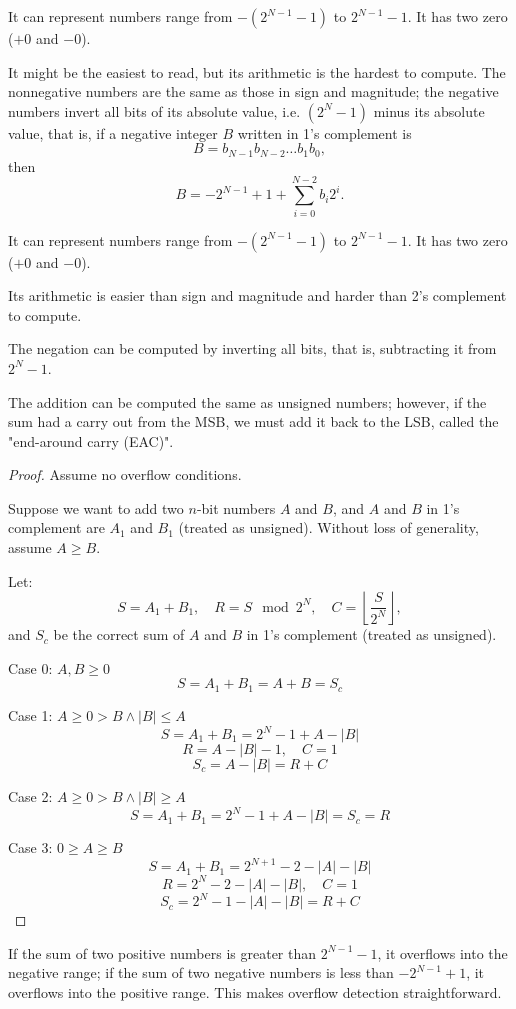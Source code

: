 \documentclass[a4paper,12pt]{report}
\begin{document}
It can represent numbers range from $-(2^{N-1}-1)$ to $2^{N-1}-1$. It has two zero ($+0$ and $-0$).

It might be the easiest to read, but its arithmetic is the hardest to compute.
The nonnegative numbers are the same as those in sign and magnitude; the negative numbers invert all bits of its absolute value, i.e. $(2^N-1)$ minus its absolute value, that is, if a negative integer $B$ written in 1's complement is
\[B=b_{N-1}b_{N-2}\ldots b_1b_0,\]
then
\[B=-2^{N-1}+1+\sum_{i=0}^{N-2}b_i2^i.\]

It can represent numbers range from $-(2^{N-1}-1)$ to $2^{N-1}-1$. It has two zero ($+0$ and $-0$). 

Its arithmetic is easier than sign and magnitude and harder than 2's complement to compute. 

The negation can be computed by inverting all bits, that is, subtracting it from $2^N-1$.

The addition can be computed the same as unsigned numbers; however, if the sum had a carry out from the MSB, we must add it back to the LSB, called the "end-around carry (EAC)".
\begin{proof}
Assume no overflow conditions.

Suppose we want to add two $n$-bit numbers $A$ and $B$, and $A$ and $B$ in 1's complement are $A_1$ and $B_1$ (treated as unsigned). Without loss of generality, assume $A\geq B$.

Let:
\[S = A_1 + B_1,\quad R=S \mod 2^N, \quad C=\left\lfloor\frac{S}{2^N}\right\rfloor,\]
and $S_c$ be the correct sum of $A$ and $B$ in 1's complement (treated as unsigned).

Case 0: $A,B\geq 0$
\[S =A_1+B_1=A+B=S_c\]

Case 1: $A\geq 0>B\land |B|\leq A$
\[S =A_1+B_1=2^N-1+A-|B|\]
\[R=A-|B|-1,\quad C=1\]
\[S_c=A-|B|=R+C\]

Case 2: $A\geq 0>B\land |B|\geq A$
\[S =A_1+B_1=2^N-1+A-|B|=S_c=R\]

Case 3: $0\geq A\geq B$
\[S=A_1+B_1=2^{N+1}-2-|A|-|B|\]
\[R=2^N-2-|A|-|B|,\quad C=1\]
\[S_c=2^N-1-|A|-|B|=R+C\]
\end{proof}

If the sum of two positive numbers is greater than $2^{N-1}-1$, it overflows into the negative range; if the sum of two negative numbers is less than $-2^{N-1}+1$, it overflows into the positive range. This makes overflow detection straightforward.
\end{document}
